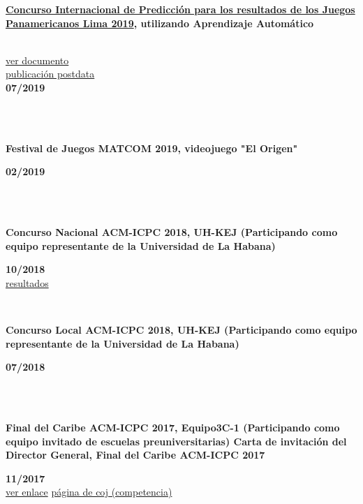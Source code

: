 \documentclass{article}
\begin{document}
\begin{minipage}{0.8\textwidth}
\parbox{0.8\linewidth}{\textbf{\hyperref[sec:panamerican]{Concurso Internacional de Predicción para los resultados de los Juegos Panamericanos Lima 2019}, utilizando Aprendizaje Automático} }\\
\href{https://github.com/JavierOramas/PanamericanPredictor/blob/master/panamerican_predictor_paper.pdf}{ver documento}\\
\href{http://www.postdata.club/issues/201907/el-medallero-de-lima-2019-que-se-puede-esperar.html}{publicación postdata}\\
\hfill \textbf{07/2019}\\
\\
\end{minipage} \hfill {}\\
\begin{minipage}{0.8\textwidth}
\parbox{0.8\linewidth}{\textbf{Festival de Juegos MATCOM 2019, videojuego "El Origen"}} \hfill \textbf{02/2019}\\
\\
\end{minipage}\\
\begin{minipage}{0.8\textwidth}
\parbox{0.8\linewidth}{\textbf{Concurso Nacional ACM-ICPC 2018, UH-KEJ (Participando como equipo representante de la Universidad de La Habana)} }\hfill \textbf{10/2018}\\
\href{https://icpc.global/regionals/finder/cnc-2018/standings}{resultados}
\\
\end{minipage} \hfill {}\\
\begin{minipage}{0.8\textwidth}
\parbox{0.8\linewidth}{\textbf{Concurso Local ACM-ICPC 2018, UH-KEJ (Participando como equipo representante de la Universidad de La Habana)}} \hfill \textbf{07/2018}\\
\\
\end{minipage} \hfill {}\\
\begin{minipage}{0.8\textwidth}
\parbox{0.8\linewidth}{\textbf{Final del Caribe ACM-ICPC 2017, Equipo3C-1 (Participando como equipo invitado de escuelas preuniversitarias)
Carta de invitación del Director General, Final del Caribe ACM-ICPC 2017}} \hfill \textbf{11/2017}\\
\href{https://matcomgrader.com/post/5167/the-2017-acm-icpc-caribbean-finals}{ver enlace}
\href{https://coj-forum.uci.cu/viewtopic.php?t=3315}{página de coj (competencia)}
\\
\end{minipage} \hfill {}\\
\end{document}
